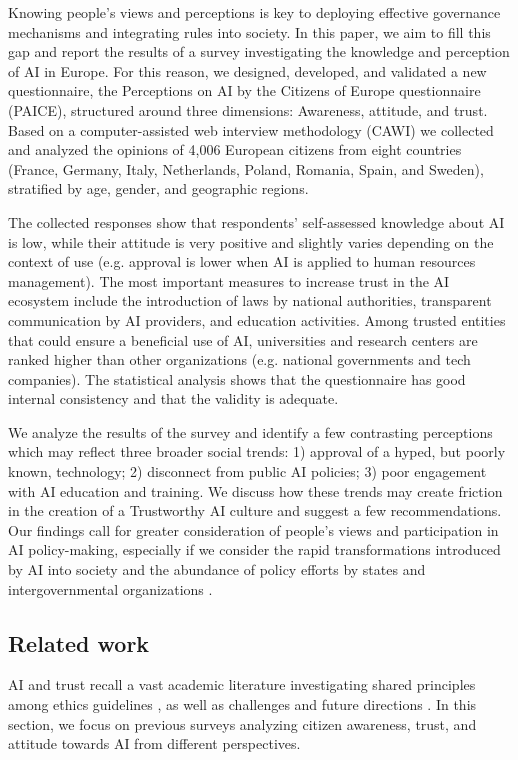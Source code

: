 \documentclass{article}
\begin{document}
Knowing people's views and perceptions is key to deploying effective governance mechanisms and integrating rules into society. In this paper, we aim to fill this gap and report the results of a survey investigating the knowledge and perception of AI in Europe. For this reason, we designed, developed, and validated a new questionnaire, the Perceptions on AI by the Citizens of Europe questionnaire (PAICE), structured around three dimensions: Awareness, attitude, and trust. Based on a computer-assisted web interview methodology (CAWI) we collected and analyzed the opinions of 4,006 European citizens from eight countries (France, Germany, Italy, Netherlands, Poland, Romania, Spain, and Sweden), stratified by age, gender, and geographic regions.

The collected responses show that respondents' self-assessed knowledge about AI is low, while their attitude is very positive and slightly varies depending on the context of use (e.g. approval is lower when AI is applied to human resources management). The most important measures to increase trust in the AI ecosystem include the introduction of laws by national authorities, transparent communication by AI providers, and education activities. Among trusted entities that could ensure a beneficial use of AI, universities and research centers are ranked higher than other organizations (e.g. national governments and tech companies). The statistical analysis shows that the questionnaire has good internal consistency and that the validity is adequate.

We analyze the results of the survey and identify a few contrasting perceptions which may reflect three broader social trends: 1) approval of a hyped, but poorly known, technology; 2) disconnect from public AI policies; 3) poor engagement with AI education and training. We discuss how these trends may create friction in the creation of a Trustworthy AI culture and suggest a few recommendations. Our findings call for greater consideration of people's views and participation in AI policy-making, especially if we consider the rapid transformations introduced by AI into society and the abundance of policy efforts by states and intergovernmental organizations \cite{oecdAI, ai_act, cheng2022shaping, AlgoAct, AfricaAI, simbeck2022facct}. 

\subsection{Related work}

AI and trust recall a vast academic literature investigating shared principles among ethics guidelines \cite{hagendorff2020ethics,gille2020we,hongladarom23}, as well as challenges and future directions \cite{siau2018building,lockey2021review,jacovi2021formalizing,glikson2020human,lee2018understanding}. In this section, we focus on previous surveys analyzing citizen awareness, trust, and attitude towards AI from different perspectives. 
\end{document}
